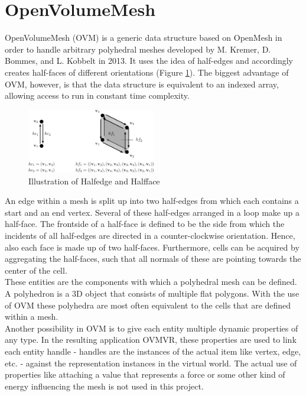 \documentclass{report}
\begin{document}
	\section[OpenVolumeMesh]{OpenVolumeMesh \textsc{\small{\cite{OVM}}}} \label{OpenVolumeMesh}
	\startsection
		OpenVolumeMesh (OVM) is a generic data structure based on OpenMesh in order to handle arbitrary polyhedral meshes developed by M. Kremer, D. Bommes, and L. Kobbelt in 2013. It uses the idea of half-edges and accordingly creates half-faces of different orientations (Figure \ref{HalfedgeHalfface}). The biggest advantage of OVM, however, is that the data structure is equivalent to an indexed array, allowing access to run in constant time complexity.
		\begin{figure}[H]
			\begin{center}
				\includegraphics[width=0.5\textwidth]{halfedge_halfface.png} 
				\caption{Illustration of Halfedge and Halfface}
				\label{HalfedgeHalfface}
			\end{center}
		\end{figure}
		\noindent An edge within a mesh is split up into two half-edges from which each contains a start and an end vertex. Several of these half-edges arranged in a loop make up a half-face. The frontside of a half-face is defined to be the side from which the incidents of all half-edges are directed in a counter-clockwise orientation. Hence, also each face is made up of two half-faces. Furthermore, cells can be acquired by aggregating the half-faces, such that all normals of these are pointing towards the center of the cell. \\
		These entities are the components with which a polyhedral mesh can be defined. A polyhedron is a 3D object that consists of multiple flat polygons. With the use of OVM these polyhedra are most often equivalent to the cells that are defined within a mesh. \\
		Another possibility in OVM is to give each entity multiple dynamic properties of any type. In the resulting application OVMVR, these properties are used to link each entity handle - handles are the instances of the actual item like vertex, edge, etc. - against the representation instances in the virtual world. The actual use of properties like attaching a value that represents a force or some other kind of energy influencing the mesh is not used in this project.
	\closesection
\end{document}
